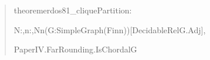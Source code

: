 \documentclass[english,11pt,a4paper]{article}
\newlength{\LeanCharWidth}
\begin{document}
\begin{quote}\fontsize{8.5}{10.2}\selectfont\ttfamily\raggedright\setlength{\parskip}{0pt}\settowidth{\LeanCharWidth}{0}
\noindent theorem\hspace*{\dimexpr 1\LeanCharWidth\relax}erdos81\_cliquePartition\hspace*{\dimexpr 1\LeanCharWidth\relax}:\par
\noindent \hspace*{\dimexpr 4\LeanCharWidth\relax}{\LeanSymbols ∃}\hspace*{\dimexpr 1\LeanCharWidth\relax}N\hspace*{\dimexpr 1\LeanCharWidth\relax}:\hspace*{\dimexpr 1\LeanCharWidth\relax}{\LeanSymbols ℕ},\hspace*{\dimexpr 1\LeanCharWidth\relax}{\LeanSymbols ∀}\hspace*{\dimexpr 1\LeanCharWidth\relax}n\hspace*{\dimexpr 1\LeanCharWidth\relax}:\hspace*{\dimexpr 1\LeanCharWidth\relax}{\LeanSymbols ℕ},\hspace*{\dimexpr 1\LeanCharWidth\relax}N\hspace*{\dimexpr 1\LeanCharWidth\relax}{\LeanSymbols ≤}\hspace*{\dimexpr 1\LeanCharWidth\relax}n\hspace*{\dimexpr 1\LeanCharWidth\relax}{\LeanSymbols →}\hspace*{\dimexpr 1\LeanCharWidth\relax}{\LeanSymbols ∀}\hspace*{\dimexpr 1\LeanCharWidth\relax}(G\hspace*{\dimexpr 1\LeanCharWidth\relax}:\hspace*{\dimexpr 1\LeanCharWidth\relax}SimpleGraph\hspace*{\dimexpr 1\LeanCharWidth\relax}(Fin\hspace*{\dimexpr 1\LeanCharWidth\relax}n))\hspace*{\dimexpr 1\LeanCharWidth\relax}[DecidableRel\hspace*{\dimexpr 1\LeanCharWidth\relax}G.Adj],\par
\noindent \hspace*{\dimexpr 6\LeanCharWidth\relax}PaperIV.FarRounding.IsChordal\hspace*{\dimexpr 1\LeanCharWidth\relax}G\hspace*{\dimexpr 1\LeanCharWidth\relax}{\LeanSymbols →}\par

\end{quote}
\end{document}
